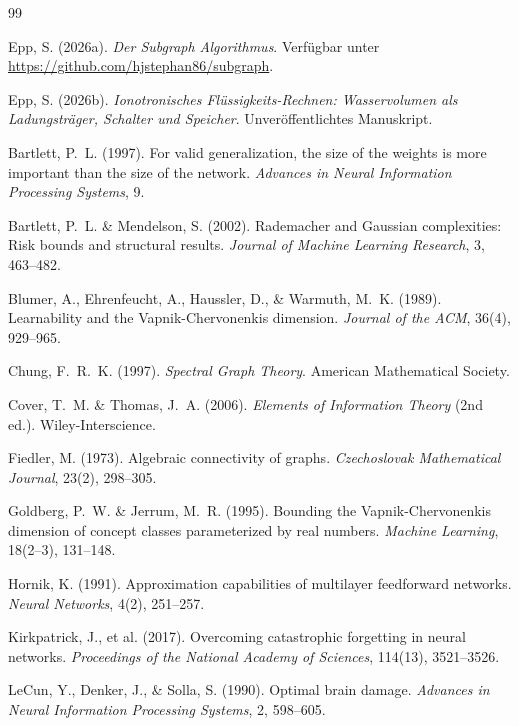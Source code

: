 ﻿\documentclass[12pt, a4paper, openany]{report}
\begin{document}
\begin{thebibliography}{99}

Epp, S. (2026a).
\newblock \textit{Der Subgraph Algorithmus}. Verfügbar unter \url{https://github.com/hjstephan86/subgraph}.

Epp, S. (2026b).
\newblock \textit{Ionotronisches Flüssigkeits-Rechnen: Wasservolumen als Ladungsträger,
  Schalter und Speicher}. Unveröffentlichtes Manuskript.

Bartlett, P.~L. (1997).
For valid generalization, the size of the weights is more important than
the size of the network.
\textit{Advances in Neural Information Processing Systems}, 9.

Bartlett, P.~L. \& Mendelson, S. (2002).
Rademacher and Gaussian complexities: Risk bounds and structural results.
\textit{Journal of Machine Learning Research}, 3, 463--482.

Blumer, A., Ehrenfeucht, A., Haussler, D., \& Warmuth, M.~K. (1989).
Learnability and the Vapnik-Chervonenkis dimension.
\textit{Journal of the ACM}, 36(4), 929--965.

Chung, F.~R.~K. (1997).
\textit{Spectral Graph Theory}.
American Mathematical Society.

Cover, T.~M. \& Thomas, J.~A. (2006).
\textit{Elements of Information Theory} (2nd ed.).
Wiley-Interscience.

Fiedler, M. (1973).
Algebraic connectivity of graphs.
\textit{Czechoslovak Mathematical Journal}, 23(2), 298--305.

Goldberg, P.~W. \& Jerrum, M.~R. (1995).
Bounding the Vapnik-Chervonenkis dimension of concept classes
parameterized by real numbers.
\textit{Machine Learning}, 18(2--3), 131--148.

Hornik, K. (1991).
Approximation capabilities of multilayer feedforward networks.
\textit{Neural Networks}, 4(2), 251--257.

Kirkpatrick, J., et al. (2017).
Overcoming catastrophic forgetting in neural networks.
\textit{Proceedings of the National Academy of Sciences}, 114(13), 3521--3526.

LeCun, Y., Denker, J., \& Solla, S. (1990).
Optimal brain damage.
\textit{Advances in Neural Information Processing Systems}, 2, 598--605.


\end{thebibliography}
\end{document}
